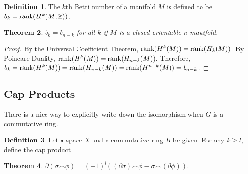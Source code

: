 \documentclass[psamsfonts]{amsart}
\newtheorem{thm}{Theorem}[section]
\theoremstyle{definition}
\newtheorem{defn}[thm]{Definition}
\theoremstyle{rem}
\numberwithin{equation}{section}
\begin{document}
\begin{defn}
  The $k$th Betti number of a manifold $M$ is defined to be $b_k = \rank(H^k(M; \mathbb{Z}))$.
\end{defn}

\begin{thm}
  $b_k = b_{n - k}$ for all $k$ if $M$ is a closed orientable $n$-manifold.
\end{thm}

\begin{proof}
  By the Universal Coefficient Theorem, $\rank(H^k(M)) = \rank(H_k(M))$.
  By Poincare Duality, $\rank(H^k(M)) = \rank(H_{n - k}(M))$.
  Therefore, $b_k = \rank(H^k(M)) = \rank(H_{n - k}(M)) = \rank(H^{n - k}(M)) = b_{n - k}$.
\end{proof}

\subsection{Cap Products}
There is a nice way to explicitly write down the isomorphism when $G$ is a commutative ring.

\begin{defn}
  Let a space $X$ and a commutative ring $R$ be given.
  For any $k \geq l$, define the cap product
  \begin{center}
  \end{center}
\end{defn}

\begin{thm}\label{cap_product_formula}
  $\partial (\sigma \frown \phi) = (-1)^l((\partial \sigma) \frown \phi - \sigma \frown (\partial \phi))$.
\end{thm}
\end{document}
